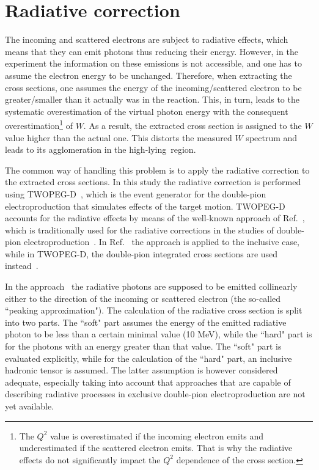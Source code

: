 \section{Radiative correction}
\label{Sect:rad_corr}

The incoming and scattered electrons are subject to radiative effects, which means that they can emit photons thus reducing their energy. However, in the experiment the information on these emissions is not accessible, and one has to assume the electron energy to be unchanged. Therefore, when extracting the cross sections, one assumes the energy of the incoming/scattered electron to be greater/smaller than it actually was in the reaction. This, in turn, leads to the systematic overestimation of the virtual photon energy with the consequent overestimation\footnote[2]{The $Q^2$ value is overestimated if the incoming electron emits and underestimated if the scattered electron emits. That is why the radiative effects do not significantly impact the $Q^{2}$ dependence of the cross section.} of $W$. As a result, the extracted cross section is assigned to the $W$ value higher than the actual one. This distorts the measured $W$ spectrum and leads to its agglomeration in the high-lying~region.


The common way of handling this problem is to apply the radiative correction to the extracted cross sections. In this study the radiative correction is performed using TWOPEG-D~\cite{twopeg-d}, which is the event generator for the double-pion electroproduction that simulates effects of the target motion. TWOPEG-D accounts for the radiative effects by means of the well-known approach of Ref.~\cite{Mo:1968cg}, which is traditionally used for the radiative corrections in the studies of double-pion electroproduction~\cite{Rip_an_note:2002,Ripani:2002ss,Fed_an_note:2007,Fedotov:2008aa,Fed_an_note:2017,Fed_paper_2018,Isupov:2017lnd,Arjun}. In Ref.~\cite{Mo:1968cg} the approach is applied to the inclusive case, while in TWOPEG-D, the double-pion integrated cross sections are used instead~\cite{twopeg,twopeg-d}. 

In the approach~\cite{Mo:1968cg,twopeg,twopeg-d} the radiative photons are supposed to be emitted collinearly either to the direction of the incoming or scattered electron (the so-called ``peaking approximation"). The calculation of the radiative cross section is split into two parts. The ``soft" part assumes the energy of the emitted radiative photon to be less than a certain minimal value (10 MeV), while the ``hard" part is for the photons with an energy greater than that value. The ``soft" part is evaluated explicitly, while for the calculation of the ``hard" part, an inclusive hadronic tensor is assumed. The latter assumption is however considered adequate, especially taking into account that approaches that are capable of describing radiative processes in exclusive double-pion electroproduction are not yet available.


